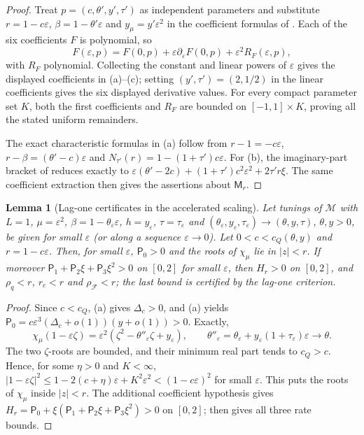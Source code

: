 \documentclass[11pt]{article}
\newtheorem{lemma}[theorem]{Lemma}
\theoremstyle{definition}
\theoremstyle{remark}
\newcommand{\cF}{\mathcal F}
\newcommand{\cM}{\mathcal M}
\newcommand{\sfP}{\mathsf P}
\newcommand{\rhoF}{\rho_{\cF}}
\newcommand{\cQ}{c_{Q}}
\begin{document}
\begin{proof}
Treat \(p=(c,\theta',y',\tau')\) as independent parameters and substitute
\(r=1-c\varepsilon\), \(\beta=1-\theta'\varepsilon\) and
\(y_\mu=y'\varepsilon^2\) in the coefficient formulas of
.  Each of the six coefficients \(F\) is polynomial, so
\[
F(\varepsilon,p)=F(0,p)+\varepsilon\partial_\varepsilon F(0,p)
+\varepsilon^2R_F(\varepsilon,p),
\]
with \(R_F\) polynomial.  Collecting the constant and linear powers of
\(\varepsilon\) gives the displayed coefficients in (a)--(c);
setting \((y',\tau')=(2,1/2)\) in the linear coefficients gives the six displayed derivative values.
For every compact parameter set \(K\), both the first coefficients and
\(R_F\) are bounded on \([-1,1]\times K\), proving all the stated uniform remainders.

The exact characteristic formulas in (a) follow from
\(r-1=-c\varepsilon\), \(r-\beta=(\theta'-c)\varepsilon\) and
\(N_{\tau'}(r)=1-(1+\tau')c\varepsilon\).
For (b), the imaginary-part bracket of  reduces exactly to
\(\varepsilon(\theta'-2c)+(1+\tau')c^2\varepsilon^2+2\tau'r\xi\).
The same coefficient extraction then gives the assertions about \(\mathsf M_r\).
\end{proof}

\begin{lemma}[Lag-one certificates in the accelerated scaling]\label{lem:lagscaled}
Let tunings of \(\cM\) with \(L=1\), \(\mu=\varepsilon^2\), \(\beta=1-\theta_\varepsilon\varepsilon\), \(h=y_\varepsilon\), \(\tau=\tau_\varepsilon\) and
\((\theta_\varepsilon,y_\varepsilon,\tau_\varepsilon)\to(\theta,y,\tau)\), \(\theta,y>0\), be given for small \(\varepsilon\) (or along a sequence \(\varepsilon\to0\)).  Let
\(0<c<\cQ(\theta,y)\) and \(r=1-c\varepsilon\).  Then, for small \(\varepsilon\), \(\sfP_0>0\) and the roots of \(\chi_\mu\) lie in \(|z|<r\).  If moreover
\(\sfP_1+\sfP_2\xi+\sfP_3\xi^2>0\) on \([0,2]\) for small \(\varepsilon\), then \(H_r>0\) on \([0,2]\), and \(\rho_q<r\), \(r_c<r\) and \(\rhoF<r\); the last bound is
certified by the lag-one criterion.
\end{lemma}

\begin{proof}
Since \(c<\cQ\), (a) gives
\(\Delta_c>0\), and (a) yields
\(\sfP_0=c\varepsilon^3(\Delta_c+o(1))(y+o(1))>0\).
Exactly,
\[
\chi_\mu(1-\varepsilon\zeta)
=\varepsilon^2(\zeta^2-\theta''_\varepsilon\zeta+y_\varepsilon),
\qquad
\theta''_\varepsilon=
\theta_\varepsilon+y_\varepsilon(1+\tau_\varepsilon)\varepsilon\to\theta.
\]
The two \(\zeta\)-roots are bounded, and their minimum real part tends to \(\cQ>c\).
Hence, for some \(\eta>0\) and \(K<\infty\),
\(|1-\varepsilon\zeta|^2\le1-2(c+\eta)\varepsilon
+K^2\varepsilon^2<(1-c\varepsilon)^2\) for small \(\varepsilon\).
This puts the roots of \(\chi_\mu\) inside \(|z|<r\).
The additional coefficient hypothesis gives
\(H_r=\sfP_0+\xi(\sfP_1+\sfP_2\xi+\sfP_3\xi^2)>0\)
on \([0,2]\);  then gives all three rate bounds.
\end{proof}
\end{document}
